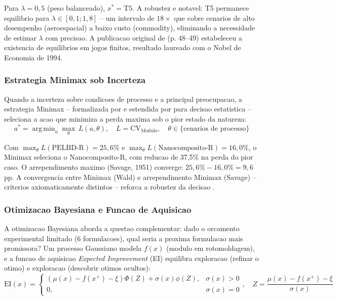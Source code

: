 \documentclass[11pt,a4paper,oneside]{article}
\DeclareMathOperator*{\argmin}{arg\,min}
\begin{document}
Para $\lambda{=}0{,}5$ (peso balanceado), $x^*{=}\text{T5}$. A robustez e notavel: T5 permanece
equilibrio para $\lambda{\in}[0{,}1;1{,}8]$ -- um intervalo de $18{\times}$ que cobre cenarios
de alto desempenho (aeroespacial) a baixo custo (commodity), eliminando a necessidade de estimar
$\lambda$ com precisao. A publicacao original de \citet{Nash1950} (p. 48--49) estabeleceu a
existencia de equilibrios em jogos finitos, resultado laureado com o Nobel de Economia de 1994.

\subsubsection{Estrategia Minimax sob Incerteza}

Quando a incerteza sobre condicoes de processo e a principal preocupacao, a estrategia Minimax
-- formalizada por \citet{VonNeumann1928} e estendida por \citet{Wald1945} para decisao
estatistica -- seleciona a acao que minimiza a perda maxima sob o pior estado da natureza:
\begin{equation}
a^* = \argmin_{a} \max_{\theta}\, L(a, \theta),\quad L = \text{CV}_{\text{Modulo}},\quad \theta \in \{\text{cenarios de processo}\}
\label{eq:minimax_gt}
\end{equation}

Com $\max_\theta L(\text{PELBD-R}){=}25{,}6\%$ e $\max_\theta L(\text{Nanocomposito-R}){=}16{,}0\%$,
o Minimax seleciona o Nanocomposito-R, com reducao de 37,5\% na perda do pior caso. O
arrependimento maximo (Savage, 1951) converge: $25{,}6\%{-}16{,}0\%{=}9{,}6$ pp. A convergencia
entre Minimax (Wald) e arrependimento Minimax (Savage) -- criterios axiomaticamente distintos --
reforca a robustez da decisao \cite{VonNeumann1928, Wald1945}.

\subsubsection{Otimizacao Bayesiana e Funcao de Aquisicao}

A otimizacao Bayesiana \cite{Jones1998} aborda a questao complementar: dado o orcamento
experimental limitado (6 formulacoes), qual seria a proxima formulacao mais promissora? Um
processo Gaussiano modela $f(x)$ (modulo em rotomoldagem), e a funcao de aquisicao \textit{Expected
Improvement} (EI) equilibra exploracao (refinar o otimo) e exploracao (descobrir otimos ocultos):
\begin{equation}
\text{EI}(x) = \begin{cases}
(\mu(x) - f(x^+) - \xi)\Phi(Z) + \sigma(x)\phi(Z), & \sigma(x) > 0\\
0, & \sigma(x) = 0
\end{cases},\quad Z = \frac{\mu(x) - f(x^+) - \xi}{\sigma(x)}
\label{eq:ei_closed_gt}
\end{equation}
\end{document}
